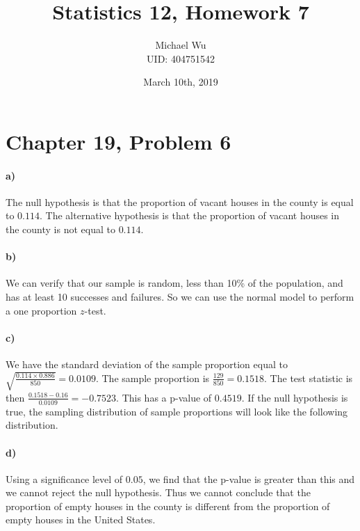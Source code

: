 \documentclass[12pt]{article}
\begin{document}
\title{Statistics 12, Homework 7}
\date{March 10th, 2019}
\author{Michael Wu\\UID: 404751542}
\maketitle

\section*{Chapter 19, Problem 6}

\paragraph{a)}

The null hypothesis is that the proportion of vacant houses in the county is equal to \(0.114\). The alternative
hypothesis is that the proportion of vacant houses in the county is not equal to \(0.114\).

\paragraph{b)}

We can verify that our sample is random, less than 10\% of the population, and has at least 10 successes and failures. So
we can use the normal model to perform a one proportion \(z\)-test.

\paragraph{c)}

We have the standard deviation of the sample proportion equal to \(\sqrt{\frac{0.114\times0.886}{850}}=0.0109\).
The sample proportion is \(\frac{129}{850}=0.1518\). The test statistic is then \(\frac{0.1518-0.16}{0.0109}=-0.7523\).
This has a p-value of \(0.4519\). If the null hypothesis is true, the sampling distribution of sample proportions will
look like the following distribution.

\paragraph{d)}

Using a significance level of \(0.05\), we find that the p-value is greater than this and we cannot reject the null hypothesis.
Thus we cannot conclude that the proportion of empty houses in the county is different from the proportion of empty houses in the
United States.
\end{document}
